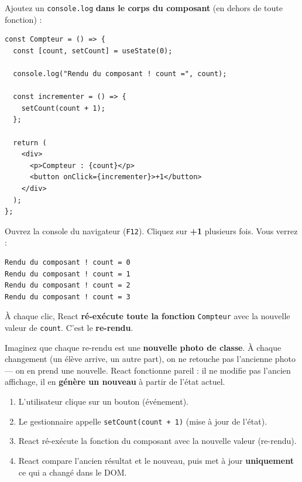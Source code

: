\documentclass[11pt,a4paper]{article}
\begin{document}
Ajoutez un \texttt{console.log} \textbf{dans le corps du composant} (en dehors de toute fonction) :

\begin{lstlisting}
const Compteur = () => {
  const [count, setCount] = useState(0);

  console.log("Rendu du composant ! count =", count);

  const incrementer = () => {
    setCount(count + 1);
  };

  return (
    <div>
      <p>Compteur : {count}</p>
      <button onClick={incrementer}>+1</button>
    </div>
  );
};
\end{lstlisting}

Ouvrez la console du navigateur (\texttt{F12}). Cliquez sur \textbf{+1} plusieurs fois. Vous verrez :

\begin{lstlisting}[style=terminal]
Rendu du composant ! count = 0
Rendu du composant ! count = 1
Rendu du composant ! count = 2
Rendu du composant ! count = 3
\end{lstlisting}

À chaque clic, React \textbf{ré-exécute toute la fonction} \texttt{Compteur} avec la nouvelle valeur de \texttt{count}. C'est le \textbf{re-rendu}.

\begin{infobox}
Imaginez que chaque re-rendu est une \textbf{nouvelle photo de classe}. À chaque changement (un élève arrive, un autre part), on ne retouche pas l'ancienne photo --- on en prend une nouvelle. React fonctionne pareil : il ne modifie pas l'ancien affichage, il en \textbf{génère un nouveau} à partir de l'état actuel.
\end{infobox}

\begin{retenirbox}
\begin{enumerate}[nosep]
    \item L'utilisateur clique sur un bouton (événement).
    \item Le gestionnaire appelle \texttt{setCount(count + 1)} (mise à jour de l'état).
    \item React ré-exécute la fonction du composant avec la nouvelle valeur (re-rendu).
    \item React compare l'ancien résultat et le nouveau, puis met à jour \textbf{uniquement} ce qui a changé dans le DOM.
\end{enumerate}
\end{retenirbox}
\end{document}
